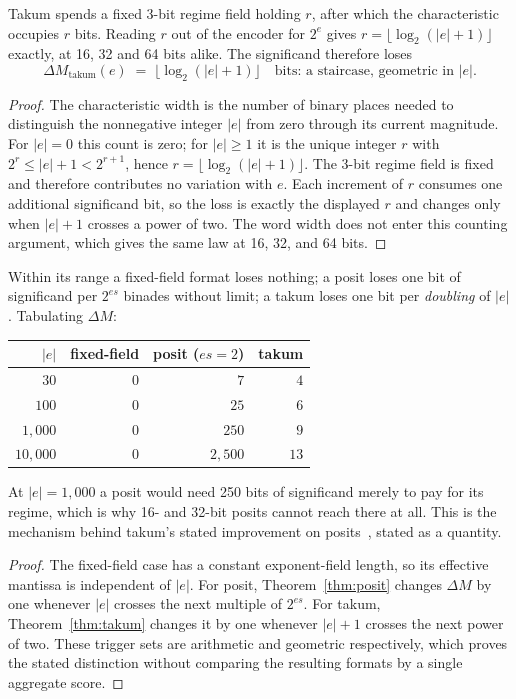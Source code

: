 \begin{theorem}\label{thm:takum}
Takum spends a fixed 3-bit regime field holding $r$, after which the
characteristic occupies $r$ bits. Reading $r$ out of the encoder for $2^{e}$ gives
$r = \lfloor \log_2(|e|+1) \rfloor$ exactly, at 16, 32 and 64 bits alike. The
significand therefore loses
\[
  \Delta M_{\text{takum}}(e) \;=\; \bigl\lfloor \log_2(|e|+1) \bigr\rfloor
  \quad\text{bits: a staircase, geometric in } |e| .
\]
\end{theorem}
\begin{proof}
The characteristic width is the number of binary places needed to distinguish
the nonnegative integer $|e|$ from zero through its current magnitude.
For $|e|=0$ this count is zero; for $|e|\ge1$ it is the unique integer $r$
with $2^r\le |e|+1<2^{r+1}$, hence
$r=\lfloor\log_2(|e|+1)\rfloor$.
The 3-bit regime field is fixed and therefore contributes no variation with
$e$. Each increment of $r$ consumes one additional significand bit, so the
loss is exactly the displayed $r$ and changes only when $|e|+1$ crosses a
power of two. The word width does not enter this counting argument, which
gives the same law at 16, 32, and 64 bits.
\end{proof}


\begin{corollary}
Within its range a fixed-field format loses nothing; a posit loses one bit of
significand per $2^{es}$ binades without limit; a takum loses one bit per
\emph{doubling} of $|e|$. Tabulating $\Delta M$:

\begin{center}
\begin{tabular}{rrrr}
\toprule
$|e|$ & fixed-field & posit ($es{=}2$) & takum \\
\midrule
$30$      & $0$ & $7$    & $4$ \\
$100$     & $0$ & $25$   & $6$ \\
$1{,}000$   & $0$ & $250$  & $9$ \\
$10{,}000$  & $0$ & $2{,}500$ & $13$ \\
\bottomrule
\end{tabular}
\end{center}

At $|e| = 1{,}000$ a posit would need 250 bits of significand merely to pay for
its regime, which is why 16- and 32-bit posits cannot reach there at all. This is
the mechanism behind takum's stated improvement on posits~\cite{takum}, stated as
a quantity.
\end{corollary}
\begin{proof}
The fixed-field case has a constant exponent-field length, so its effective
mantissa is independent of $|e|$.  For posit, Theorem~\ref{thm:posit} changes
$\Delta M$ by one whenever $|e|$ crosses the next multiple of $2^{es}$.
For takum, Theorem~\ref{thm:takum} changes it by one whenever $|e|+1$
crosses the next power of two.  These trigger sets are arithmetic and
geometric respectively, which proves the stated distinction without comparing
the resulting formats by a single aggregate score.
\end{proof}

